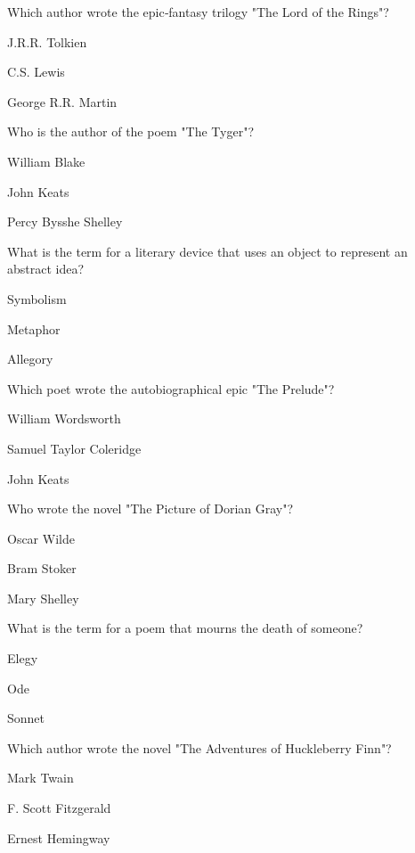 \begin{enhancedmcq}{Which author wrote the epic‑fantasy trilogy "The Lord of the Rings"?}
\item J.R.R. Tolkien
\item C.S. Lewis
\item George R.R. Martin

\end{enhancedmcq}
\begin{enhancedmcq}{Who is the author of the poem "The Tyger"?}
\item William Blake
\item John Keats
\item Percy Bysshe Shelley

\end{enhancedmcq}
\begin{enhancedmcq}{What is the term for a literary device that uses an object to represent an abstract idea?}
\item Symbolism
\item Metaphor
\item Allegory

\end{enhancedmcq}
\begin{enhancedmcq}{Which poet wrote the autobiographical epic "The Prelude"?}
\item William Wordsworth
\item Samuel Taylor Coleridge
\item John Keats

\end{enhancedmcq}
\begin{enhancedmcq}{Who wrote the novel "The Picture of Dorian Gray"?}
\item Oscar Wilde
\item Bram Stoker
\item Mary Shelley

\end{enhancedmcq}
\begin{enhancedmcq}{What is the term for a poem that mourns the death of someone?}
\item Elegy
\item Ode
\item Sonnet

\end{enhancedmcq}
\begin{enhancedmcq}{Which author wrote the novel "The Adventures of Huckleberry Finn"?}
\item Mark Twain
\item F. Scott Fitzgerald
\item Ernest Hemingway

\end{enhancedmcq}
